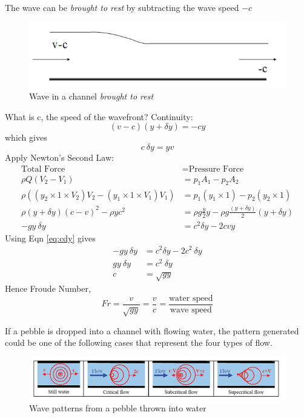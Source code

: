 \documentclass[a4paper, 12pt, british]{article} %
\numberwithin{equation}{section}
\numberwithin{figure}{section}
\numberwithin{table}{section}
\begin{document}
The wave can be \textit{brought to rest} by subtracting the wave speed $-c$
	\begin{figure}[H]
	\centering
	\includegraphics[scale=0.5]{./images/fr_waves_02.png}
	\caption{Wave in a channel \textit{brought to rest} }
	\label{fig:fr02}
\end{figure}
What is c, the speed of the wavefront?
Continuity:
\begin{equation*}
(v-c)(y+\delta y)=-cy
\end{equation*}
which gives
\begin{equation}
c\ \delta y = y v
\label{eq:cdy}
\end{equation}
Apply Newton’s Second Law:
\begin{align*}
\text{Total Force} &= \text{Pressure Force} \nonumber \\
\rho Q (V_2 - V_1) &= p_1 A_1 - p_2 A_2 \nonumber \\
\rho \left( (y_2\times 1 \times V_2) V_2 - (y_1 \times 1 \times V_1) V_1 \right) &= p_1 (y_1 \times 1) - p_2 (y_2 \times 1) \nonumber \\
\rho (y+\delta y)(c-v)^2 - \rho y c^2 &= \rho g \frac{y}{2}y -\rho g \frac{(y+\delta y)}{2}(y+\delta y) \nonumber \\ 
-gy\ \delta y &= c^2 \delta y - 2cvy \nonumber
\end{align*}
Using Eqn \ref{eq:cdy} gives
\begin{align}
-gy\ \delta y &= c^2 \delta y - 2c^2\ \delta y \nonumber \\
gy\ \delta y &= c^2\ \delta y \nonumber \\
c &= \sqrt{gy}
\end{align}
Hence Froude Number, 
\begin{equation}
Fr = \frac{v}{\sqrt{gy}} = \frac{v}{c} = \frac{\text{water speed}}{\text{wave speed}}
\end{equation}

If a pebble is dropped into a channel with flowing water, the pattern generated could be one of the following cases that represent the four types of flow.
	\begin{figure}[H]
	\centering
	\includegraphics[scale=0.5]{./images/fr_pebble_waves.png}
	\caption{Wave patterns from a pebble thrown into water}
	\label{fig:fr03}
\end{figure}
\end{document}
